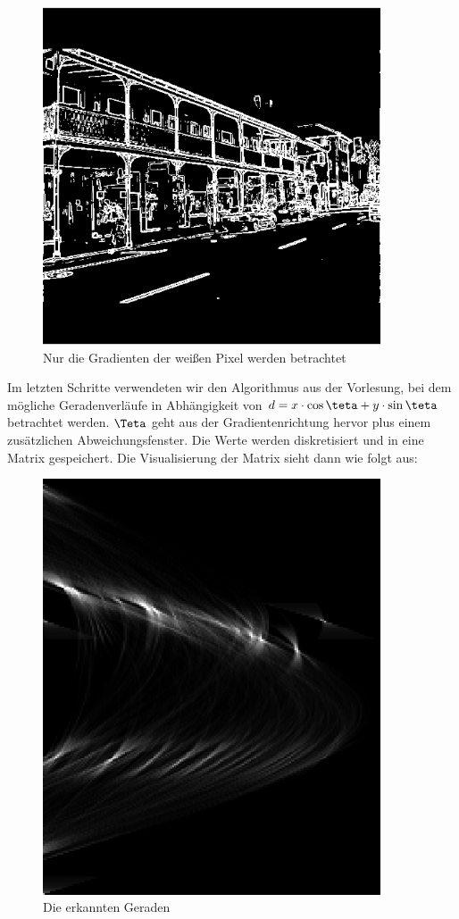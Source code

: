 \begin{figure}[H]
\begin{center}
\includegraphics[width=100mm]{u10/street_edges.eps}
\end{center}
\label{streete}
\caption{Nur die Gradienten der wei\ss en Pixel werden betrachtet}
\end{figure}

Im letzten Schritte verwendeten wir den Algorithmus aus der Vorlesung, bei dem 
m\"ogliche Geradenverl\"aufe in Abh\"angigkeit von $d = x \cdot \cos \teta  + y \cdot \sin \teta $
betrachtet werden. $\Teta$ geht aus der Gradientenrichtung hervor plus einem zus\"atzlichen
Abweichungsfenster. Die Werte werden diskretisiert und in eine Matrix gespeichert. Die Visualisierung
der Matrix sieht dann wie folgt aus:

\begin{figure} [H]
\begin{center}
\includegraphics[width=100mm]{u10/street_lines.eps}
\end{center}
\label{streetl}
\caption{Die erkannten Geraden}
\end{figure}

